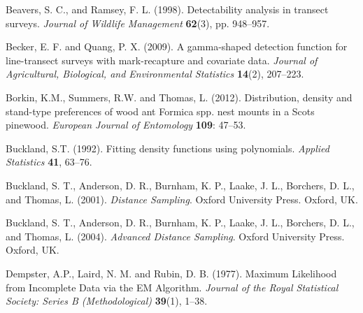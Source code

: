 \documentclass[useAMS,referee]{biom}
\begin{document}


\begin{thebibliography}{}

\bibitem{ } Beavers, S. C., and Ramsey, F. L. (1998). Detectability analysis in transect surveys. \textit{Journal of Wildlife Management} \textbf{62}(3), pp. 948--957.

\bibitem{ } Becker, E. F. and Quang, P. X. (2009). A gamma-shaped detection function for line-transect surveys with mark-recapture and covariate data. \textit{Journal of Agricultural, Biological, and Environmental Statistics} \textbf{14}(2), 207--223.

\bibitem{ } Borkin, K.M., Summers, R.W. and Thomas, L. (2012). Distribution, density and stand-type preferences of wood ant Formica spp. nest mounts in a Scots pinewood. \textit{European Journal of Entomology} \textbf{109}: 47--53.

\bibitem{ } Buckland, S.T. (1992). Fitting density functions using polynomials. \textit{Applied Statistics} \textbf{41}, 63--76. 

\bibitem{ }  Buckland, S. T., Anderson, D. R., Burnham, K. P., Laake, J. L., Borchers, D. L., and Thomas, L.  (2001). \textit{Distance Sampling}. Oxford University Press. Oxford, UK.

\bibitem{ }  Buckland, S. T., Anderson, D. R., Burnham, K. P., Laake, J. L., Borchers, D. L., and Thomas, L.  (2004). \textit{Advanced Distance Sampling}. Oxford University Press. Oxford, UK.

\bibitem{ } Dempster, A.P., Laird,  N. M. and Rubin, D. B. (1977). Maximum Likelihood from Incomplete Data via the EM Algorithm. \textit{Journal of the Royal Statistical Society: Series B (Methodological)} \textbf{39}(1), 1--38.


\end{thebibliography}
\end{document}
